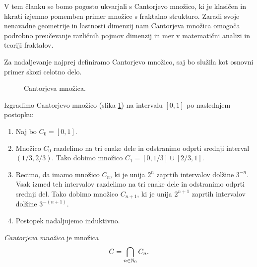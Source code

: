 V tem članku se bomo pogosto ukvarjali s Cantorjevo množico, ki je klasičen in hkrati izjemno pomemben primer množice s fraktalno strukturo. Zaradi svoje nenavadne geometrije in lastnosti dimenzij nam Cantorjeva množica omogoča podrobno preučevanje različnih pojmov dimenzij in mer v matematični analizi in teoriji fraktalov.

Za nadaljevanje najprej definiramo Cantorjevo množico, saj bo služila kot osnovni primer skozi celotno delo.

\begin{figure}[ht]
    \centering
    \caption{Cantorjeva množica.}
    \label{fig:cantor-set}
\end{figure}

Izgradimo Cantorjevo množico (slika \ref{fig:cantor-set}) na intervalu \([0,1]\) po naslednjem postopku:
\begin{enumerate}
    \item Naj bo \(C_0 = [0,1]\).
    \item Množico \(C_0\) razdelimo na tri enake dele in odstranimo odprti srednji interval \((1/3, 2/3)\). Tako dobimo množico \(C_1 = [0, 1/3] \cup [2/3, 1]\).
    \item Recimo, da imamo množico \(C_n\), ki je unija \(2^n\) zaprtih intervalov dolžine \(3^{-n}\). Vsak izmed teh intervalov razdelimo na tri enake dele in odstranimo odprti srednji del. Tako dobimo množico \(C_{n+1}\), ki je unija \(2^{n+1}\) zaprtih intervalov dolžine \(3^{-(n+1)}\).
    \item Postopek nadaljujemo induktivno.
\end{enumerate}

\begin{definicija}
    \emph{Cantorjeva množica} je množica
    \[
        C = \bigcap_{n \in \mathbb{N}_0} C_n.
    \]
\end{definicija}